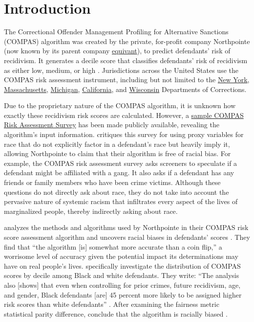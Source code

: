 \documentclass[water,article,submit,moreauthors,pdftex]{mdpi}
\begin{document}

\hypertarget{introduction}{%
\section{Introduction}\label{introduction}}

The Correctional Offender Management Profiling for Alternative Sanctions
(COMPAS) algorithm was created by the private, for-profit company
Northpointe (now known by its parent company
\href{https://www.equivant.com/faq/}{equivant}), to predict defendants'
risk of recidivism. It generates a decile score that classifies
defendants' risk of recidivism as either low, medium, or high
\citep{angwin2016machine}. Jurisdictions across the United States use
the COMPAS risk assessment instrument, including but not limited to the
\href{https://doccs.ny.gov/system/files/documents/2020/11/8500.pdf}{New
York},
\href{https://hdsr.mitpress.mit.edu/pub/hzwo7ax4/release/4}{Massachusetts},
\href{https://hdsr.mitpress.mit.edu/pub/hzwo7ax4/release/4}{Michigan},
\href{https://hdsr.mitpress.mit.edu/pub/hzwo7ax4/release/4}{California},
and \href{https://doc.wi.gov/Pages/AboutDOC/COMPAS.aspx}{Wisconsin}
Departments of Corrections.

Due to the proprietary nature of the COMPAS algorithm, it is unknown how
exactly these recidivism risk scores are calculated. However, a
\href{https://www.documentcloud.org/documents/2702103-Sample-Risk-Assessment-COMPAS-CORE\#document/p5/a296598}{sample
COMPAS Risk Assessment Survey} has been made publicly available,
revealing the algorithm's input information. \citet{angwin2016machine}
critiques this survey for using proxy variables for race that do not
explicitly factor in a defendant's race but heavily imply it, allowing
Northpointe to claim that their algorithm is free of racial bias. For
example, the COMPAS risk assessment survey asks screeners to speculate
if a defendant might be affiliated with a gang. It also asks if a
defendant has any friends or family members who have been crime victims.
Although these questions do not directly ask about race, they do not
take into account the pervasive nature of systemic racism that
infiltrates every aspect of the lives of marginalized people, thereby
indirectly asking about race.

\citet{angwin2016machine} analyzes the methods and algorithms used by
Northpointe in their COMPAS risk score assessment algorithm and uncovers
racial biases in defendants' scores \citep{angwin2016machine}. They find
that ``the algorithm {[}is{]} somewhat more accurate than a coin flip,''
a worrisome level of accuracy given the potential impact its
determinations may have on real people's lives.
\citet{angwin2016machine} specifically investigate the distribution of
COMPAS scores by decile among Black and white defendants. They write:
``The analysis also {[}shows{]} that even when controlling for prior
crimes, future recidivism, age, and gender, Black defendants {[}are{]}
45 percent more likely to be assigned higher risk scores than white
defendants'' \citep{larson2016we}. After examining the fairness metric
statistical parity difference, \citet{angwin2016machine} conclude that
the algorithm is racially biased \citep{larson2016we}.
\end{document}
